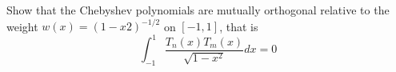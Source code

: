 \begin{problem}
Show that the Chebyshev polynomials are mutually orthogonal relative to the
weight $w(x) = (1 − x 2 )^{−1/2}$ on $[−1, 1]$, that is
\begin{equation*}
  \int_{-1}^1 \frac{T_n(x) T_m(x)}{\sqrt{ 1- x^2}} dx = 0
\end{equation*}
\end{problem}


\begin{solution}  

\end{solution}

